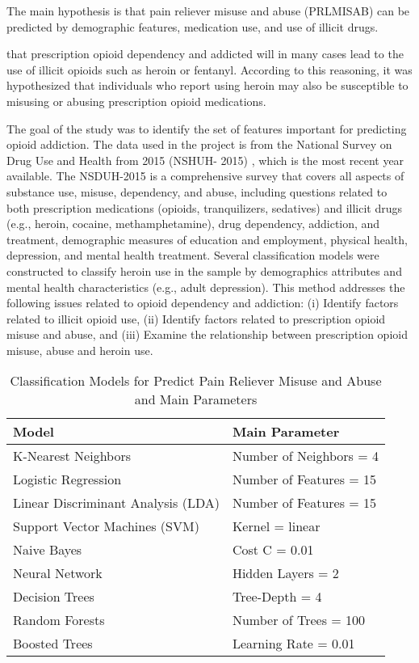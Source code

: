 \documentclass[sigconf]{acmart}
\begin{document}
The main hypothesis is that pain reliever misuse and abuse (PRLMISAB) can be
predicted by demographic features, medication use, and use of illicit drugs. 

that prescription opioid dependency and
addicted will in many cases lead to the use of illicit opioids such as heroin 
or fentanyl. 
According to this reasoning, it was hypothesized that individuals 
who report using heroin may also be susceptible to misusing or abusing 
prescription opioid medications. 

The goal of the study was to identify the set 
of features important for predicting opioid addiction. The data used in the 
project is from the National Survey on Drug Use and Health from 2015 (NSHUH-
2015) \cite{samhsa16}, which is the most recent year available. The NSDUH-2015 
is a comprehensive survey that covers all aspects of substance use, misuse, 
dependency, and abuse, including questions related to both prescription 
medications (opioids, tranquilizers, sedatives) and illicit drugs (e.g., 
heroin, cocaine, methamphetamine), drug dependency, addiction, and treatment, 
demographic measures of education and employment, physical health, depression, 
and mental health treatment. Several classification models were constructed to 
classify heroin use in the sample by demographics attributes and mental health 
characteristics (e.g., adult depression). This method addresses the following
issues related to opioid dependency and addiction: (i) Identify factors related 
to illicit opioid use, (ii) Identify factors related to prescription opioid 
misuse and abuse, and (iii) Examine the relationship between prescription 
opioid misuse, abuse and heroin use. 



\begin{table}
  \caption{Classification Models for Predict Pain Reliever Misuse 
  and Abuse and Main Parameters}
  \label{tab:freq}
  \begin{tabular}{ll}
    \toprule
    Model & Main Parameter \\
    \midrule
    K-Nearest Neighbors & Number of Neighbors = 4 \\
    Logistic Regression & Number of Features = 15 \\
    Linear Discriminant Analysis (LDA) & Number of Features = 15 \\
    Support Vector Machines (SVM) & Kernel = linear \\
    Naive Bayes & Cost C = 0.01 \\
    Neural Network & Hidden Layers = 2 \\
    Decision Trees & Tree-Depth = 4 \\ 
    Random Forests & Number of Trees = 100 \\
    Boosted Trees & Learning Rate = 0.01 \\ 
    \bottomrule
  \end{tabular}
\end{table}
\end{document}
